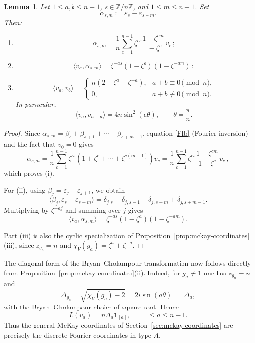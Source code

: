 \documentclass[a4paper,reqno]{amsart}
\theoremstyle{plain} %
\newtheorem{lmm}[thm]{Lemma}
\theoremstyle{definition} %
\theoremstyle{remark} %
\newcommand{\fo}{\mathbf{1}}
\newcommand{\z}{\zeta}
\newcommand{\ve}{{\varepsilon}}
\newcommand{\1}{\mathds{1}}   %
\begin{document}
\begin{lmm}\label{lem:fourier-root}
 Let $1\leq a,b\leq n-1$, $s\in\mathbb Z/n\mathbb Z$,
and $1\leq m\leq n-1$.  Set
\[
\alpha_{s,m}:= \ve_s - \ve_{s+m}.
\]
Then:
\begin{enumerate}
\item[(i)]
\[
\alpha_{s,m}
=
\frac1n\sum_{c=1}^{n-1}
\z^{cs}\frac{1-\z^{cm}}{1-\z^c}\,v_c \, ;
\]

\item[(ii)]
\[
\langle v_a,\alpha_{s,m}\rangle
=
\z^{-as}(1-\z^a)(1-\z^{-am}) \, ;
\]

\item[(iii)]
\[
\langle v_a,v_b\rangle
=
\begin{cases}
n(2-\z^a-\z^{-a}),
   & a+b\equiv0\pmod n,\\[2mm]
0,&a+b\not\equiv0\pmod n.
\end{cases}
\]
In particular,
\[
\langle v_a,v_{n-a}\rangle
=
4n\sin^2(a\theta),
\qquad
\theta=\frac{\pi}{n}.
\]
\end{enumerate}
\end{lmm}
\begin{proof}
Since $\alpha_{s,m} = \beta_s+\beta_{s+1}+\cdots+\beta_{s+m-1}$, 
equation \eqref{FIb} (Fourier inversion) and the fact that $v_0=0$ gives
\[
\alpha_{s,m}
=
\frac1n
\sum_{c=1}^{n-1}
\z^{cs}
(1+\z^c+\cdots+\z^{c(m-1)})v_c =
\frac{1}{n}
\sum_{c=1}^{n-1}
\z^{cs}
\frac{1-\z^{cm}}{1-\z^c}\,v_c \, ,
\]
which proves (i).

For (ii), using $\beta_j = \ve_j - \ve_{j+1}$, we obtain
\[
\langle\beta_j, \ve_s - \ve_{s+m}\rangle
=
\delta_{j,s}-\delta_{j,s-1}
-\delta_{j,s+m}+\delta_{j,s+m-1}.
\]
Multiplying by $\z^{-aj}$ and summing over $j$ gives
\[
\langle v_a,\alpha_{s,m}\rangle
=
\z^{-as}(1-\z^a)(1-\z^{-am}).
\]

Part (iii) is also the cyclic specialization of
Proposition~\ref{prop:mckay-coordinates}(iii), since $z_{g_a}=n$ and
$\chi_V(g_a)=\z^a+\z^{-a}$.
\end{proof}

The diagonal form of the Bryan--Gholampour transformation now follows directly
from Proposition~\ref{prop:mckay-coordinates}(ii).  Indeed, for $g_a\neq1$ one has
$z_{g_a}=n$ and
\[
\Delta_{g_a}=\sqrt{\chi_V(g_a)-2}
=2i\sin(a\theta)=:\Delta_a,
\]
with the Bryan--Gholampour choice of square root.  Hence
\begin{equation}\label{BGL'}
L(v_a)=n\Delta_a\fo_{[a]},
\qquad 1\leq a\leq n-1.
\end{equation}
Thus the general McKay coordinates of Section~\ref{sec:mckay-coordinates}
are precisely the discrete Fourier coordinates in type $A$.
\end{document}

